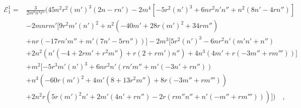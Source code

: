 \documentclass[12pt]{book}
\begin{document}
\begin{equation}
\begin{split}
    \mathcal{E}_1^1=&\frac{3}{2 m^6 n^3 r^5} \Bigg( 45 n^2 r^2 (m')^3 (2 n - r n') - 2 m^4  [ -5 r^2 (n')^3 + 6 n r^2 n' n'' + n^2 (8 n' - 4 r n'')  ] \\ & - 2 m n r m'  [ 9 r^2 m' (n')^2 + n^2  ( -40 m' + 28 r (m')^2 + 34 r m''  ) \\ & + n r  ( -17 r n' m'' + m' (7 n' - 5 r n'')  )  ] - 2 m^3  [ 5 r^2 (n')^3 - 6 n r^2 n' (m' n' + n'') \\ & + 2 n^2  ( n' (-4 + 2 r m' + r^2 m'') + r (2 + r m') n''  ) + 4 n^3  ( 4 m' + r (-3 m'' + r m''')  )  ] \\ & + m^2  [ -5 r^3 m' (n')^3 + 6 n r^2 n'  ( r n' m'' + m' (-3 n' + r n'')  ) \\ & + n^3  ( -60 r (m')^2 + 4 m' (8 + 13 r^2 m'') + 8 r (-3 m'' + r m''')  ) \\ & + 2 n^2 r  ( 5 r (m')^2 n' + 2 m' (4 n' + r n'') - 2 r  ( r m'' n'' + n' (-m'' + r m''')  )  )  ] \Bigg)\label{eq: ResultadosReales - cubico - S - 11}\quad,
\end{split}
\end{equation}
\end{document}
